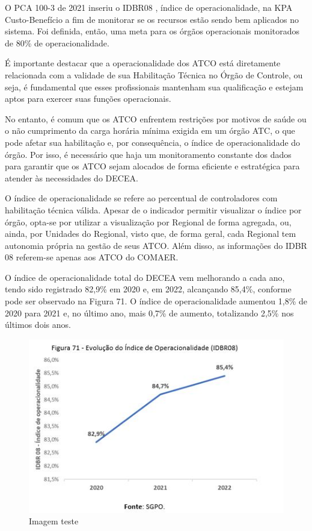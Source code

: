 \documentclass[
]{book}
\begin{document}
O PCA 100-3 de 2021 inseriu o IDBR08 , índice de operacionalidade, na KPA Custo-Benefício a fim de monitorar se os recursos estão sendo bem aplicados no sistema. Foi definida, então, uma meta para os órgãos operacionais monitorados de 80\% de operacionalidade.

É importante destacar que a operacionalidade dos ATCO está diretamente relacionada com a validade de sua Habilitação Técnica no Órgão de Controle, ou seja, é fundamental que esses profissionais mantenham sua qualificação e estejam aptos para exercer suas funções operacionais.

No entanto, é comum que os ATCO enfrentem restrições por motivos de saúde ou o não cumprimento da carga horária mínima exigida em um órgão ATC, o que pode afetar sua habilitação e, por consequência, o índice de operacionalidade do órgão. Por isso, é necessário que haja um monitoramento constante dos dados para garantir que os ATCO sejam alocados de forma eficiente e estratégica para atender às necessidades do DECEA.

O índice de operacionalidade se refere ao percentual de controladores com habilitação técnica válida. Apesar de o indicador permitir visualizar o índice por órgão, opta-se por utilizar a visualização por Regional de forma agregada, ou, ainda, por Unidades do Regional, visto que, de forma geral, cada Regional tem autonomia própria na gestão de seus ATCO. Além disso, as informações do IDBR 08 referem-se apenas aos ATCO do COMAER.

O índice de operacionalidade total do DECEA vem melhorando a cada ano, tendo sido registrado 82,9\% em 2020 e, em 2022, alcançando 85,4\%, conforme pode ser observado na Figura 71. O índice de operacionalidade aumentou 1,8\% de 2020 para 2021 e, no último ano, mais 0,7\% de aumento, totalizando 2,5\% nos últimos dois anos.

\begin{figure}
\centering
\includegraphics{imagens/fig57.jpg}
\caption{Imagem teste}
\end{figure}
\end{document}

